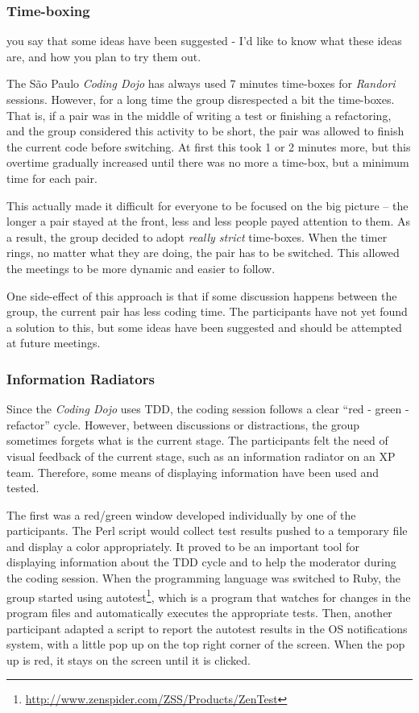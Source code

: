 \subsubsection{Time-boxing}

{\Large you say that some ideas have been suggested - I'd like to know
  what these ideas are, and how you plan to try them out.}

The São Paulo \emph{Coding Dojo} has always used 7 minutes time-boxes
for \emph{Randori} sessions. However, for a long time the group
disrespected a bit the time-boxes. That is, if a pair was in the
middle of writing a test or finishing a refactoring, and the group
considered this activity to be short, the pair was allowed to finish
the current code before switching. At first this took 1 or 2 minutes
more, but this overtime gradually increased until there was no more a
time-box, but a minimum time for each pair.

This actually made it difficult for everyone to be focused on the big
picture -- the longer a pair stayed at the front, less and less people
payed attention to them. As a result, the group decided to adopt
\emph{really strict} time-boxes. When the timer rings, no matter
what they are doing, the pair has to be switched. This allowed the
meetings to be more dynamic and easier to follow.

One side-effect of this approach is that if some discussion happens
between the group, the current pair has less coding time. The
participants have not yet found a solution to this, but some ideas
have been suggested and should be attempted at future meetings.

\subsubsection{Information Radiators}

Since the \emph{Coding Dojo} uses TDD, the coding session follows a
clear ``red - green - refactor'' cycle. However, between discussions or
distractions, the group sometimes forgets what is the current
stage. The participants felt the need of visual feedback of the
current stage, such as an information radiator on an XP team. Therefore,
some means of displaying information have been used and tested.

The first was a red/green window developed individually by one of the
participants. The Perl script would collect test results pushed to a
temporary file and display a color appropriately. It proved to be an
important tool for displaying information about the TDD cycle and
to help the moderator during the coding session. When the programming
language was switched to Ruby, the group started using
autotest\footnote{\url{http://www.zenspider.com/ZSS/Products/ZenTest}},
which is a program that watches for changes in the program files and
automatically executes the appropriate tests. Then, another participant
adapted a script to report the autotest results in the OS notifications
system, with a little pop up on the top right corner of the screen. When
the pop up is red, it stays on the screen until it is clicked.

